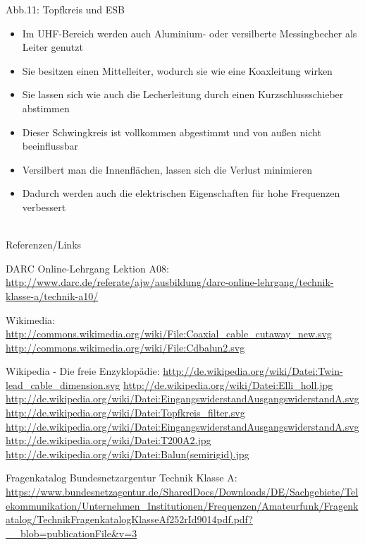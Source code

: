 \begin{frame}
\begin{center}
Abb.11: Topfkreis und ESB
\end{center}
\begin{tiny}
\begin{itemize}
	\item	Im UHF-Bereich werden auch Aluminium- oder versilberte Messingbecher als Leiter genutzt
	\item	Sie besitzen einen Mittelleiter, wodurch sie wie eine Koaxleitung wirken
	\item	Sie lassen sich wie auch die Lecherleitung durch einen Kurzschlussschieber abstimmen
	\item	Dieser Schwingkreis ist vollkommen abgestimmt und von außen nicht beeinflussbar
	\item	Versilbert man die Innenflächen, lassen sich die Verlust minimieren
	\item	Dadurch werden auch die elektrischen Eigenschaften für hohe Frequenzen verbessert
\end{itemize}
\end{tiny}
\end{frame}

\renewcommand{\refname}{Referenzen}

\hypertarget{refs}{}
\textcolor{white}{} \\ %
\Large Referenzen/Links
\footnotesize

\begin{thebibliography}{}
      DARC Online-Lehrgang Lektion A08:
                    \url{http://www.darc.de/referate/ajw/ausbildung/darc-online-lehrgang/technik-klasse-a/technik-a10/}
    
     	Wikimedia:
                    \url{http://commons.wikimedia.org/wiki/File:Coaxial_cable_cutaway_new.svg}
                    \url{http://commons.wikimedia.org/wiki/File:Cdbalun2.svg}
                        
        Wikipedia - Die freie Enzyklopädie:
                    \url{http://de.wikipedia.org/wiki/Datei:Twin-lead_cable_dimension.svg}
					\url{http://de.wikipedia.org/wiki/Datei:Elli_holl.jpg}
					\url{http://de.wikipedia.org/wiki/Datei:EingangswiderstandAusgangswiderstandA.svg}
					\url{http://de.wikipedia.org/wiki/Datei:Topfkreis_filter.svg}
					\url{http://de.wikipedia.org/wiki/Datei:EingangswiderstandAusgangswiderstandA.svg}
					\url{http://de.wikipedia.org/wiki/Datei:T200A2.jpg}
					\url{http://de.wikipedia.org/wiki/Datei:Balun(semirigid).jpg}

									
	   Fragenkatalog Bundesnetzargentur Technik Klasse A:                   
                    \url{https://www.bundesnetzagentur.de/SharedDocs/Downloads/DE/Sachgebiete/Telekommunikation/Unternehmen_Institutionen/Frequenzen/Amateurfunk/Fragenkatalog/TechnikFragenkatalogKlasseAf252rId9014pdf.pdf?__blob=publicationFile&v=3}
\end{thebibliography} 


